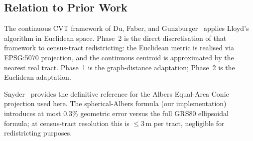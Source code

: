 \subsection{Relation to Prior Work}

The continuous CVT framework of Du, Faber, and Gunzburger~\citeyear{du1999}
applies Lloyd's algorithm in Euclidean space.
Phase~2 \cvdgeo{} is the direct discretisation of that framework to
census-tract redistricting: the Euclidean metric is realised via EPSG:5070
projection, and the continuous centroid is approximated by the nearest real tract.
Phase~1 \cvd{} is the graph-distance adaptation; Phase~2 \cvdgeo{} is the
Euclidean adaptation.

Snyder~\citeyear{snyder1987} provides the definitive reference for the Albers
Equal-Area Conic projection used here.
The spherical-Albers formula (our implementation) introduces at most 0.3\%
geometric error versus the full GRS80 ellipsoidal formula; at census-tract
resolution this is $\le 3$\,m per tract, negligible for redistricting purposes.
